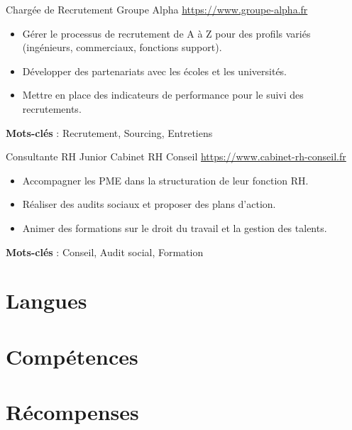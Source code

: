 \documentclass[a4paper, serif, 10pt]{moderncv}
\begin{document}
        {Chargée de Recrutement}
        {Groupe Alpha}
        {\url{https://www.groupe-alpha.fr}}
        {}
        {\begin{itemize}
\item Gérer le processus de recrutement de A à Z pour des profils variés (ingénieurs, commerciaux, fonctions support).
\item Développer des partenariats avec les écoles et les universités.
\item Mettre en place des indicateurs de performance pour le suivi des recrutements.
\end{itemize}
\textbf{Mots-clés} : Recrutement, Sourcing, Entretiens}

        {Consultante RH Junior}
        {Cabinet RH Conseil}
        {\url{https://www.cabinet-rh-conseil.fr}}
        {}
        {\begin{itemize}
\item Accompagner les PME dans la structuration de leur fonction RH.
\item Réaliser des audits sociaux et proposer des plans d'action.
\item Animer des formations sur le droit du travail et la gestion des talents.
\end{itemize}
\textbf{Mots-clés} : Conseil, Audit social, Formation}
\section{Langues}

\section{Compétences}

\section{Récompenses}
\end{document}
